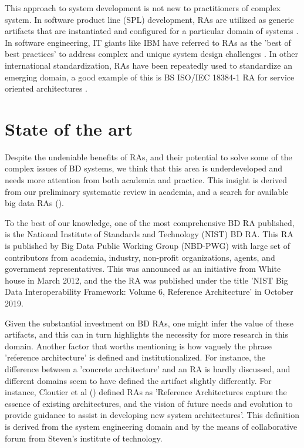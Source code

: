 \documentclass[review]{elsarticle}
\begin{document}
This approach to system development is not new to practitioners of complex system. In software product line (SPL) development, RAs are utilized as generic artifacts that are instantiated and configured for a particular domain of systems \cite{Derras}. In software engineering, IT giants like IBM have referred to RAs as the 'best of best practices' to address complex and unique system design challenges \cite{Cloutier}. In other international standardization, RAs have been repeatedly used to standardize an emerging domain, a good example of this is BS ISO/IEC 18384-1 RA for service oriented architectures \cite{Iso18384-1}. 

\section{State of the art}

Despite the undeniable benefits of RAs, and their potential to solve some of the complex issues of BD systems, we think that this area is underdeveloped and needs more attention from both academia and practice. This insight is derived from our preliminary systematic review in academia, and a search for available big data RAs (\cite{AtaeiACIS}).

To the best of our knowledge, one of the most comprehensive BD RA published, is the National Institute of Standards and Technology (NIST) BD RA. This RA is published by Big Data Public Working Group (NBD-PWG) with large set of contributors from academia, industry, non-profit organizations, agents, and government representatives. This was announced as an initiative from White house in March 2012, and the the RA was published under the title 'NIST Big Data Interoperability Framework: Volume 6, Reference Architecture' in October 2019. 

Given the substantial investment on BD RAs, one might infer the value of these artifacts, and this can in turn highlights the necessity for more research in this domain. Another factor that worths mentioning is how vaguely the phrase 'reference architecture' is defined and institutionalized. For instance, the difference between a 'concrete architecture' and an RA is hardly discussed, and different domains seem to have defined the artifact slightly differently. For instance, Cloutier et al (\cite{Cloutier}) defined RAs as 'Reference Architectures capture the essence of existing architectures, and the vision of future needs and evolution to provide guidance to assist in developing new system architectures'. This definition is derived from the system engineering domain and by the means of collaborative forum from Steven's institute of technology. 
\end{document}
